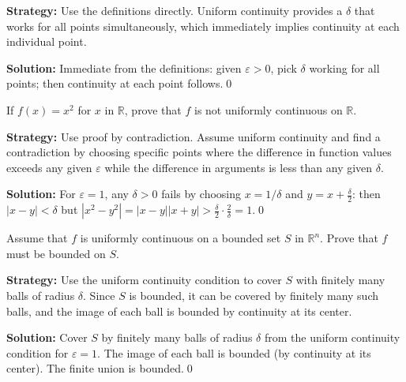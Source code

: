 \noindent\textbf{Strategy:} Use the definitions directly. Uniform continuity provides a $\delta$ that works for all points simultaneously, which immediately implies continuity at each individual point.

\bigskip\noindent\textbf{Solution:}
Immediate from the definitions: given $\varepsilon>0$, pick $\delta$ working for all points; then continuity at each point follows.\qed



\begin{problembox}
\begin{problemstatement}
If $f(x) = x^2$ for $x$ in $\mathbb{R}$, prove that $f$ is not uniformly continuous on $\mathbb{R}$.
\end{problemstatement}
\end{problembox}

\noindent\textbf{Strategy:} Use proof by contradiction. Assume uniform continuity and find a contradiction by choosing specific points where the difference in function values exceeds any given $\varepsilon$ while the difference in arguments is less than any given $\delta$.

\bigskip\noindent\textbf{Solution:}
For $\varepsilon=1$, any $\delta>0$ fails by choosing $x=1/\delta$ and $y=x+\tfrac{\delta}{2}$: then $|x-y|<\delta$ but $|x^2-y^2|=|x-y||x+y|>\tfrac{\delta}{2}\cdot\tfrac{2}{\delta}=1$.\qed



\begin{problembox}
\begin{problemstatement}
Assume that $f$ is uniformly continuous on a bounded set $S$ in $\mathbb{R}^n$. Prove that $f$ must be bounded on $S$.
\end{problemstatement}
\end{problembox}

\noindent\textbf{Strategy:} Use the uniform continuity condition to cover $S$ with finitely many balls of radius $\delta$. Since $S$ is bounded, it can be covered by finitely many such balls, and the image of each ball is bounded by continuity at its center.

\bigskip\noindent\textbf{Solution:}
Cover $S$ by finitely many balls of radius $\delta$ from the uniform continuity condition for $\varepsilon=1$. The image of each ball is bounded (by continuity at its center). The finite union is bounded.\qed



